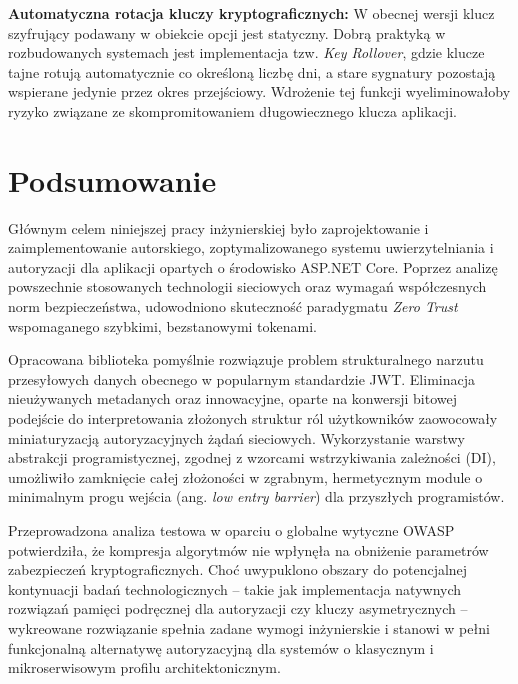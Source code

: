 \documentclass{SGGW-thesis}
\begin{document}
\textbf{Automatyczna rotacja kluczy kryptograficznych:} W obecnej wersji klucz szyfrujący podawany w obiekcie opcji jest statyczny. Dobrą praktyką w rozbudowanych systemach jest implementacja tzw. \textit{Key Rollover}, gdzie klucze tajne rotują automatycznie co określoną liczbę dni, a stare sygnatury pozostają wspierane jedynie przez okres przejściowy. Wdrożenie tej funkcji wyeliminowałoby ryzyko związane ze skompromitowaniem długowiecznego klucza aplikacji.

\clearpage

\startchapterfromoddpage
\chapter{Podsumowanie}

Głównym celem niniejszej pracy inżynierskiej było zaprojektowanie i zaimplementowanie autorskiego, zoptymalizowanego systemu uwierzytelniania i autoryzacji dla aplikacji opartych o środowisko ASP.NET Core. Poprzez analizę powszechnie stosowanych technologii sieciowych oraz wymagań współczesnych norm bezpieczeństwa, udowodniono skuteczność paradygmatu \textit{Zero Trust} wspomaganego szybkimi, bezstanowymi tokenami.

Opracowana biblioteka pomyślnie rozwiązuje problem strukturalnego narzutu przesyłowych danych obecnego w popularnym standardzie JWT. Eliminacja nieużywanych metadanych oraz innowacyjne, oparte na konwersji bitowej podejście do interpretowania złożonych struktur ról użytkowników zaowocowały miniaturyzacją autoryzacyjnych żądań sieciowych. Wykorzystanie warstwy abstrakcji programistycznej, zgodnej z wzorcami wstrzykiwania zależności (DI), umożliwiło zamknięcie całej złożoności w zgrabnym, hermetycznym module o minimalnym progu wejścia (ang. \textit{low entry barrier}) dla przyszłych programistów. 

Przeprowadzona analiza testowa w oparciu o globalne wytyczne OWASP potwierdziła, że kompresja algorytmów nie wpłynęła na obniżenie parametrów zabezpieczeń kryptograficznych. Choć uwypuklono obszary do potencjalnej kontynuacji badań technologicznych – takie jak implementacja natywnych rozwiązań pamięci podręcznej dla autoryzacji czy kluczy asymetrycznych – wykreowane rozwiązanie spełnia zadane wymogi inżynierskie i stanowi w pełni funkcjonalną alternatywę autoryzacyjną dla systemów o klasycznym i mikroserwisowym profilu architektonicznym.

\beforelastpage
\end{document}
